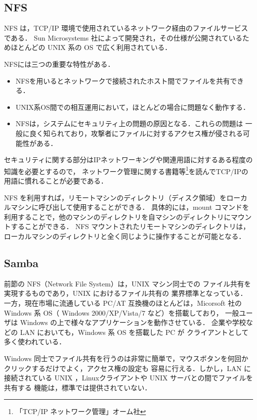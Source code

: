 \subsection*{NFS}
NFS は，TCP/IP 環境で使用されているネットワーク経由のファイルサービスである．
Sun Microsystems 社によって開発され，その仕様が公開されているためほとんどの UNIX 系の OS で広く利用されている．

NFSには三つの重要な特性がある．
\begin{itemize}
\item NFSを用いるとネットワークで接続されたホスト間でファイルを共有できる．
\item UNIX系OS間での相互運用において，ほとんどの場合に問題なく動作する．
\item NFSは，システムにセキュリティ上の問題の原因となる．これらの問題は
      一般に良く知られており，攻撃者にファイルに対するアクセス権が侵される可能性がある．
\end{itemize}
セキュリティに関する部分はIPネットワーキングや関連用語に対するある程度の知識を必要とするので，
ネットワーク管理に関する書籍等\footnote{「TCP/IP ネットワーク管理」オーム社}を読んでTCP/IPの用語に慣れることが必要である．

NFS を利用すれば，リモートマシンのディレクトリ（ディスク領域）をローカルマシンに呼び出して使用することができる．
具体的には，mount コマンドを利用することで，他のマシンのディレクトリを自マシンのディレクトリにマウントすることができる．
NFS マウントされたリモートマシンのディレクトリは，ローカルマシンのディレクトリと全く同じように操作することが可能となる．

\subsection*{Samba}
前節の NFS（Network File System）は，UNIX マシン同士での
ファイル共有を実現するものであり，UNIX におけるファイル共有の
業界標準となっている．
一方，現在市場に流通している PC/AT 互換機のほとんどは，Micorsoft 社の
Windows 系 OS（ Windows 2000/XP/Vista/7 など）を搭載しており，
一般ユーザは Windows の上で様々なアプリケーションを動作させている．
企業や学校などの LAN においても，Windows 系 OS を搭載した PC が
クライアントとして多く使われている．

Windows 同士でファイル共有を行うのは非常に簡単で，マウスボタンを何回か
クリックするだけでよく，アクセス権の設定も 容易に行える．しかし，LAN に
接続されている UNIX ，Linuxクライアントや UNIX サーバとの間でファイルを共有する
機能は，標準では提供されていない．

